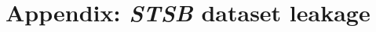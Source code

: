 \documentclass[14pt]{article}
\begin{document}
\newpage
\section{Appendix: \textit{STSB} dataset leakage}

\end{document}
